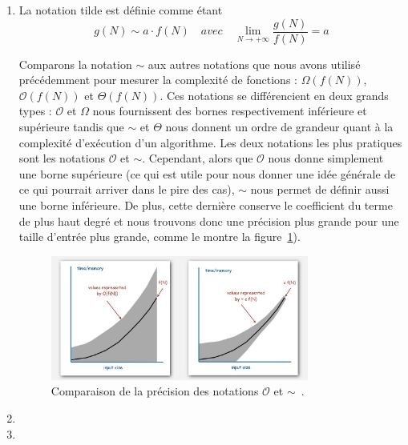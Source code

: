 \begin{enumerate}
	\item La notation tilde est définie comme étant\cite{tilde-pdf}
        $$g(N) \sim a \cdot f(N) \quad avec \quad \lim\limits_{N
        \to +\infty} \frac{g(N)}{f(N)} = a$$

	Comparons la notation $\sim$ aux autres notations que
        nous avons utilisé précédemment pour mesurer la complexité
        de fonctions :
	$\Omega(f(N))$, $\mathcal{O}(f(N))$ et $\Theta(f(N))$.
	Ces notations se différencient en deux grands types :
        $\mathcal{O}$ et $\Omega$ nous fournissent des bornes
        respectivement inférieure et supérieure tandis que $\sim$
        et $\Theta$ nous donnent un ordre de grandeur quant à la
        complexité d'exécution d'un algorithme.
	Les deux notations les plus pratiques sont les notations
        $\mathcal{O}$ et $\sim$. Cependant, alors que $\mathcal{O}$
        nous donne simplement une borne supérieure (ce qui est utile
        pour nous donner une idée générale de ce qui pourrait arriver
        dans le pire des cas), $\sim$ nous permet de définir aussi une
        borne inférieure. De plus, cette dernière conserve le coefficient
        du terme de plus haut degré et nous trouvons donc une précision
        plus grande pour une taille d'entrée plus grande, comme le montre
        la figure~\ref{fig:complex_tilde}).

        \begin{figure}[ht]
                \centering
	        \includegraphics[width=0.8\textwidth]{complex_tilde.jpg}
	        \caption{Comparaison de la précision des notations
                $\mathcal{O}$ et $\sim$~\cite{image-complex}.}
	        \label{fig:complex_tilde}
        \end{figure}	

	\item
	\item
\end{enumerate}





